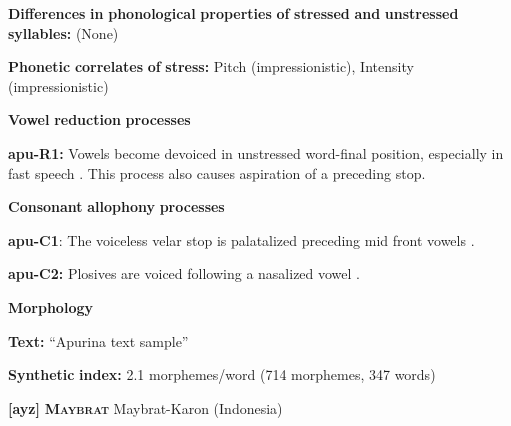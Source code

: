 \documentclass[output=paper]{langsci/langscibook}
\begin{document}
\begin{styleBody}
\textbf{Differences} \textbf{in} \textbf{phonological} \textbf{properties} \textbf{of} \textbf{stressed} \textbf{and} \textbf{unstressed} \textbf{syllables:} (None)
\end{styleBody}

\begin{styleBody}
\textbf{Phonetic} \textbf{correlates} \textbf{of} \textbf{stress:} Pitch (impressionistic), Intensity (impressionistic)
\end{styleBody}

\begin{styleBody}
\textbf{Vowel} \textbf{reduction} \textbf{processes}
\end{styleBody}

\begin{styleBody}
\textbf{apu-R1:} Vowels become devoiced in unstressed word-final position, especially in fast speech \citep[60-1]{Facundes2000}. This process also causes aspiration of a preceding stop.
\end{styleBody}

\begin{styleBody}
\textbf{Consonant} \textbf{allophony} \textbf{processes}
\end{styleBody}

\begin{styleBody}
\textbf{apu-C1}: The voiceless velar stop is palatalized preceding mid front vowels \citep[76]{Facundes2000}.
\end{styleBody}

\begin{styleBody}
\textbf{apu-C2:} Plosives are voiced following a nasalized vowel \citep[73]{Facundes2000}.
\end{styleBody}

\begin{styleBody}
\textbf{Morphology}
\end{styleBody}

\begin{styleBody}
\textbf{Text:} “Apurina text sample” \citep[625-642]{Facundes2000}
\end{styleBody}

\begin{styleBody}
\textbf{Synthetic} \textbf{index:} 2.1 morphemes/word (714 morphemes, 347 words)
\end{styleBody}

\begin{styleBody}
\textbf{[ayz]}   \textbf{\textsc{Maybrat}}  Maybrat-Karon (Indonesia)
\end{styleBody}
\end{document}
